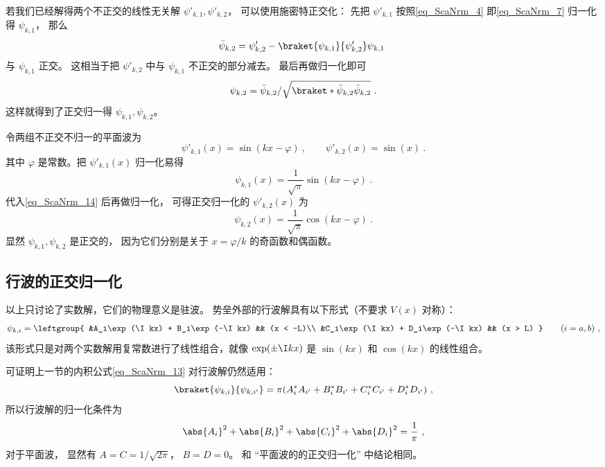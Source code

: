 若我们已经解得两个不正交的线性无关解 $\psi'_{k,1}, \psi'_{k,2}$， 可以使用施密特正交化： 先把 $\psi'_{k,1}$ 按照\autoref{eq_ScaNrm_4} 即\autoref{eq_ScaNrm_7} 归一化得 $\psi_{k,1}$， 那么
\begin{equation}\label{eq_ScaNrm_14}
\bar\psi_{k,2} = \psi_{k,2}' - \braket{\psi_{k,1}}{\psi'_{k,2}} \psi_{k,1}~
\end{equation}
与 $\psi_{k,1}$ 正交。 这相当于把 $\psi'_{k,2}$ 中与 $\psi_{k,1}$ 不正交的部分减去。 最后再做归一化即可
\begin{equation}\label{eq_ScaNrm_15}
\psi_{k,2} = \bar\psi_{k,2}/\sqrt{\braket*{\bar\psi_{k,2}}{\bar\psi_{k,2}}}~.
\end{equation}
这样就得到了正交归一得 $\psi_{k,1}, \psi_{k,2}$。

\begin{example}{}
令两组不正交不归一的平面波为
\begin{equation}
\psi'_{k,1}(x) = \sin(kx - \varphi)~, \qquad
\psi'_{k,2}(x) = \sin(x)~.
\end{equation}
其中 $\varphi$ 是常数。把 $\psi'_{k,1}(x)$ 归一化易得
\begin{equation}
\psi_{k,1}(x) = \frac{1}{\sqrt{\pi}}\sin(kx - \varphi)~.
\end{equation}
代入\autoref{eq_ScaNrm_14} 后再做归一化， 可得正交归一化的 $\psi'_{k,2}(x)$ 为
\begin{equation}
\psi_{k,2}(x) = \frac{1}{\sqrt{\pi}}\cos(kx - \varphi)~.
\end{equation}
显然 $\psi_{k,1}, \psi_{k,2}$ 是正交的， 因为它们分别是关于 $x = \varphi/k$ 的奇函数和偶函数。
\end{example}

\subsection{行波的正交归一化}
以上只讨论了实数解，它们的物理意义是驻波。 势垒外部的行波解具有以下形式（不要求 $V(x)$ 对称）：
\begin{equation}
\psi_{k,i} = \leftgroup{
    &A_i\exp(\I kx) + B_i\exp(-\I kx) && (x < -L)\\
    &C_i\exp(\I kx) + D_i\exp(-\I kx) && (x > L)
} \qquad (i = a,b)~,
\end{equation}
该形式只是对两个实数解用复常数进行了线性组合，就像 $\exp(\pm\I kx)$ 是 $\sin(kx)$ 和 $\cos(kx)$ 的线性组合。

可证明上一节的内积公式\autoref{eq_ScaNrm_13} 对行波解仍然适用：
\begin{equation}
\braket{\psi_{k,i}}{\psi_{k,i'}} = \pi (A_i^* A_{i'} + B_i^* B_{i'} + C_i^* C_{i'} + D_i^* D_{i'})~,
\end{equation}
所以行波解的归一化条件为
\begin{equation}
\abs{A_i}^2 + \abs{B_i}^2 + \abs{C_i}^2 + \abs{D_i}^2= \frac{1}{\pi}~,
\end{equation}
对于平面波， 显然有 $A = C = 1/\sqrt{2\pi}$， $B = D = 0$。 和 “平面波的的正交归一化” 中结论相同。

